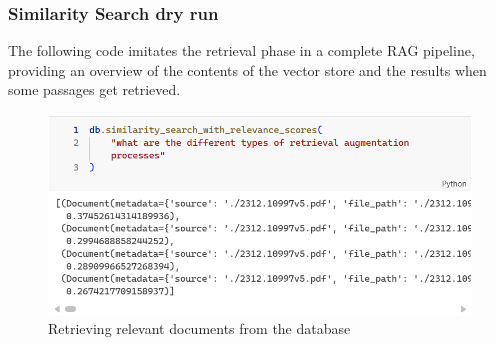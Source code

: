 \subsubsection{Similarity Search dry run}
The following code imitates the retrieval phase in a complete RAG pipeline, providing an overview of the contents of the vector store and the results when some passages get retrieved.\newline
\begin{figure}[H]
    \centering
    \includegraphics[width=\linewidth]{./figures/vectorstoresimilaritysearchwithscore_code.png}
    \caption{Retrieving relevant documents from the database}
\end{figure}
